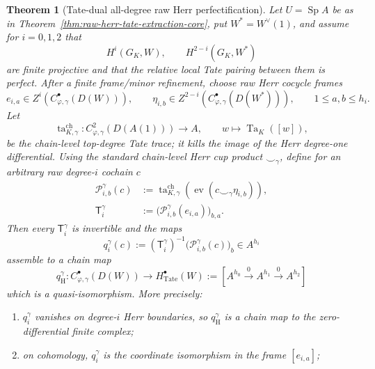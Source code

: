 \documentclass[11pt]{article}
\newtheorem{theorem}{Theorem}[section]
\theoremstyle{definition}
\begin{document}
\begin{theorem}[Tate-dual all-degree raw Herr perfectification]\label{thm:raw-herr-all-degree-perfectification}
Let $U=\operatorname{Sp}A$ be as in Theorem~\ref{thm:raw-herr-tate-extraction-core}, put $W^{\ast}=W^{\vee}(1)$, and assume for $i=0,1,2$ that
\[
 H^i(G_K,W),\qquad H^{2-i}(G_K,W^{\ast})
\]
are finite projective and that the relative local Tate pairing between them is perfect.  After a finite frame/minor refinement, choose raw Herr cocycle frames
\[
 e_{i,a}\in Z^i\!\left(C^\bullet_{\varphi,\gamma}(D(W))\right),
 \qquad
 \eta_{i,b}\in Z^{2-i}\!\left(C^\bullet_{\varphi,\gamma}(D(W^{\ast}))\right),
 \qquad 1\le a,b\le h_i.
\]
Let
\[
 \operatorname{ta}^{\mathrm{ch}}_{K,\gamma}:
 C^2_{\varphi,\gamma}(D(A(1)))\longrightarrow A,
 \qquad
 w\longmapsto \operatorname{Ta}_K([w]),
\]
be the chain-level top-degree Tate trace; it kills the image of the Herr degree-one differential.  Using the standard chain-level Herr cup product $\smile_\gamma$, define for an arbitrary raw degree-$i$ cochain $c$
\begin{align}
 \mathcal P^{\gamma}_{i,b}(c)
 &:=\operatorname{ta}^{\mathrm{ch}}_{K,\gamma}
 \left(
 \operatorname{ev}(c\smile_\gamma\eta_{i,b})
 \right),
 \label{eq:raw-herr-all-degree-functional}\\
 \mathsf T_i^{\gamma}
 &:=\bigl(\mathcal P^{\gamma}_{i,b}(e_{i,a})\bigr)_{b,a}.
 \label{eq:raw-herr-all-degree-tate-matrix}
\end{align}
Then every $\mathsf T_i^{\gamma}$ is invertible and the maps
\begin{equation}\label{eq:raw-herr-all-degree-projection}
 q_i^{\gamma}(c)
 :=(\mathsf T_i^{\gamma})^{-1}
   \bigl(\mathcal P^{\gamma}_{i,b}(c)\bigr)_b
 \in A^{h_i}
\end{equation}
assemble to a chain map
\begin{equation}\label{eq:raw-herr-finite-perfectification}
 \boxed{
 q_{\mathrm H}^{\gamma}:
 C^\bullet_{\varphi,\gamma}(D(W))
 \longrightarrow
 H^\bullet_{\mathrm{Tate}}(W)
 :=\left[A^{h_0}\xrightarrow{0}A^{h_1}\xrightarrow{0}A^{h_2}\right]
 }
\end{equation}
which is a quasi-isomorphism.  More precisely:
\begin{enumerate}[label=\textnormal{(\roman*)}]
\item $q_i^{\gamma}$ vanishes on degree-$i$ Herr boundaries, so $q_{\mathrm H}^{\gamma}$ is a chain map to the zero-differential finite complex;
\item on cohomology, $q_i^{\gamma}$ is the coordinate isomorphism in the frame $[e_{i,a}]$;

\end{enumerate}
\end{theorem}
\end{document}
